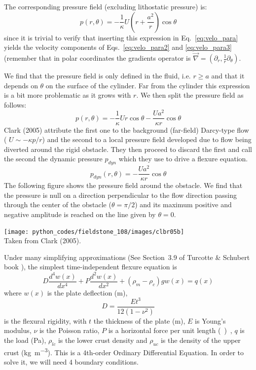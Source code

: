 The corresponding pressure field (excluding lithostatic pressure) is: 
\[
p(r,\theta) = -\frac{1}{\kappa} U \left( r  + \frac{a^2}{r}  \right)\cos \theta
\]
since it is trivial to verify that inserting this expression in Eq.~\eqref{eq:velo_para} yields the velocity components of Eqs.~\eqref{eq:velo_para2} and \eqref{eq:velo_para3} (remember that in polar coordinates the gradients operator is $\vec\nabla=(\partial_r , \frac{1}{r} \partial_\theta)$.

We find that the pressure field is only defined in the fluid, i.e. $r\geq a$ and that it depends on $\theta$ on the surface of the cylinder. Far from the cylinder this expression is a bit more problematic as it grows with $r$. We then split the pressure field as follows:
\[
p(r,\theta) = 
-\frac{1}{\kappa} U r  \cos \theta
 -\frac{U a^2 }{\kappa r}  \cos \theta
\]
Clark \etal (2005) attribute the first one to the background (far-field) Darcy-type flow ( $U \sim - \kappa p/r$) and the second to a local pressure field developed
due to flow being diverted around the rigid obstacle. They 
then proceed to discard the first and call the second the dynamic pressure $p_{dyn}$ which they use to drive a flexure equation. 
\[
p_{dyn}(r,\theta) = -\frac{U a^2 }{\kappa r}  \cos \theta
\]
The following figure shows the pressure field around the obstacle.
We find that the pressure is null on a direction perpendicular to the flow direction passing through the center of the obstacle ($\theta=\pi/2$) and its maximum positive and negative amplitude is reached on the line given by $\theta=0$.
\begin{center}
\texttt{[image: python\_codes/fieldstone\_108/images/clbr05b]}\\
{\captionfont 
Taken from Clark \etal (2005). }
\end{center}

Under many simplifying approximations (See Section~3.9 of Turcotte \& Schubert book \cite{tusc}), 
the simplest time-independent flexure equation is
\[
D \frac{d^4w(x)}{dx^4} + P \frac{d^2w(x)}{dx^2} + (\rho_m-\rho_c)g w(x) = q(x)
\]
where $w(x)$ is the plate deflection (\si{m}), 
\[
D=\frac{E t^3}{12(1-\nu^2)}
\]
is the flexural rigidity, with $t$ the thickness of the plate (\si{m}), 
$E$ is Young's modulus, $\nu$ is the Poisson ratio, 
$P$ is a horizontal force per unit length (\si{\kg\per\square\metre\square\sec}),  
$q$ is the load (\si{\pascal}), 
$\rho_{lc}$ is the lower crust density and $\rho_{uc}$ is the density of the upper crust (\si{\kg\per\cubic\metre}).
This is a 4th-order Ordinary Differential Equation. 
In order to solve it, we will need 4 boundary conditions.

